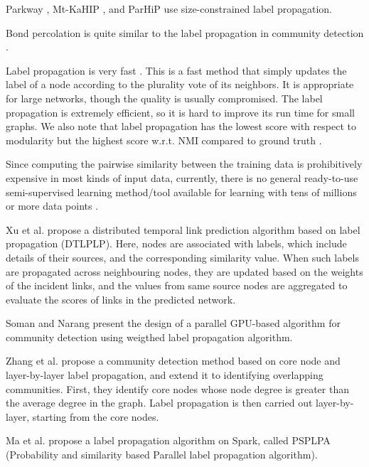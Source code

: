 {Parkway \cite{trifunovic2004k}, Mt-KaHIP \cite{akhremtsev2020high}, and ParHiP \cite{meyerhenke2017parallel} use size-constrained label propagation.

Bond percolation is quite similar to the label propagation in community detection \cite{peng2014accelerating}.

Label propagation is very fast \cite{peng2014accelerating}. This is a fast method that simply updates the label of a node according to the plurality vote of its neighbors. It is appropriate for large networks, though the quality is usually compromised. The label propagation is extremely efficient, so it is hard to improve its run time for small graphs\cite{peng2014accelerating}. We also note that label propagation has the lowest score with respect to modularity but the highest score w.r.t. NMI compared to ground truth \cite{peng2014accelerating}.

Since computing the pairwise similarity between the training data is prohibitively expensive in most kinds of input data, currently, there is no general ready-to-use semi-supervised learning method/tool available for learning with tens of millions or more data points \cite{petegrosso2017low}.

Xu et al. \cite{xu2019distributed} propose a distributed temporal link prediction algorithm based on label propagation (DTLPLP). Here, nodes are associated with labels, which include details of their sources, and the corresponding similarity value. When such labels are propagated across neighbouring nodes, they are updated based on the weights of the incident links, and the values from same source nodes are aggregated to evaluate the scores of links in the predicted network.

Soman and Narang \cite{soman2011fast} present the design of a parallel GPU-based algorithm for community detection using weigthed label propagation algorithm.

Zhang et al. \cite{zhang2023large} propose a community detection method based on core node and layer-by-layer label propagation, and extend it to identifying overlapping communities. First, they identify core nodes whose node degree is greater than the average degree in the graph. Label propagation is then carried out layer-by-layer, starting from the core nodes.

Ma et al. \cite{ma2018psplpa} propose a label propagation algorithm on Spark, called PSPLPA (Probability and similarity based Parallel label propagation algorithm).

}
